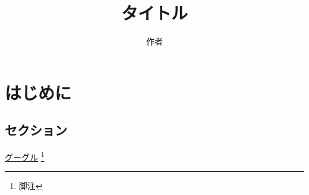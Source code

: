 \documentclass[uplatex, oneside]{jsbook}
\title{タイトル}
\author{作者}
\begin{document}
\maketitle
\tableofcontents

\chapter{はじめに}

\section{セクション}

\href{http://www.google.co.jp}{グーグル}
\footnote{脚注}
\end{document}
